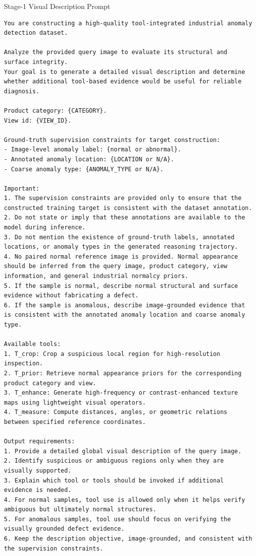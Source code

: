\documentclass{article}
\begin{document}
{\begin{promptbox}{Stage-1 Visual Description Prompt}
\begin{lstlisting}[style=promptstyle]
You are constructing a high-quality tool-integrated industrial anomaly detection dataset.

Analyze the provided query image to evaluate its structural and surface integrity. 
Your goal is to generate a detailed visual description and determine whether additional tool-based evidence would be useful for reliable diagnosis.

Product category: {CATEGORY}.
View id: {VIEW_ID}.

Ground-truth supervision constraints for target construction:
- Image-level anomaly label: {normal or abnormal}.
- Annotated anomaly location: {LOCATION or N/A}.
- Coarse anomaly type: {ANOMALY_TYPE or N/A}.

Important:
1. The supervision constraints are provided only to ensure that the constructed training target is consistent with the dataset annotation.
2. Do not state or imply that these annotations are available to the model during inference.
3. Do not mention the existence of ground-truth labels, annotated locations, or anomaly types in the generated reasoning trajectory.
4. No paired normal reference image is provided. Normal appearance should be inferred from the query image, product category, view information, and general industrial normalcy priors.
5. If the sample is normal, describe normal structural and surface evidence without fabricating a defect.
6. If the sample is anomalous, describe image-grounded evidence that is consistent with the annotated anomaly location and coarse anomaly type.

Available tools:
1. T_crop: Crop a suspicious local region for high-resolution inspection.
2. T_prior: Retrieve normal appearance priors for the corresponding product category and view.
3. T_enhance: Generate high-frequency or contrast-enhanced texture maps using lightweight visual operators.
4. T_measure: Compute distances, angles, or geometric relations between specified reference coordinates.

Output requirements:
1. Provide a detailed global visual description of the query image.
2. Identify suspicious or ambiguous regions only when they are visually supported.
3. Explain which tool or tools should be invoked if additional evidence is needed.
4. For normal samples, tool use is allowed only when it helps verify ambiguous but ultimately normal structures.
5. For anomalous samples, tool use should focus on verifying the visually grounded defect evidence.
6. Keep the description objective, image-grounded, and consistent with the supervision constraints.
\end{lstlisting}
\end{promptbox}

}
\end{document}
